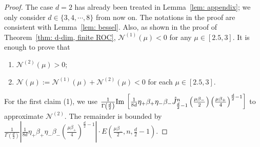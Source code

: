 \documentclass[11pt,a4paper,english,reqno]{amsart}
\theoremstyle{plain}
\newcommand{\1}{\mathbbm{1}}
\begin{document}
\begin{proof}
The case $d = 2$ has already been treated in Lemma~\ref{lem: appendix}; we only consider $d \in \{3, 4, \cdots, 8\}$ from now on.  The notations in the proof are consistent with Lemma~\ref{lem: bessel}. Also, as shown in the proof of Theorem~\ref{thm: d-dim, finite ROC}, $\mathcal{N}^{(1)}(\mu) < 0$ for any $\mu \in [2.5, 3]$. It is  enough to prove that
\begin{enumerate}
\item
$\mathcal{N}^{(2)}(\mu) >0$;
\item
$\mathcal{N}(\mu):=\mathcal{N}^{(1)}(\mu) + \mathcal{N}^{(2)}(\mu) < 0$ for each $\mu \in [2.5, 3]$.
\end{enumerate}

For the first claim (1), we use $\frac{1}{\Gamma\left(\frac{d}{2}\right)}{\rm Im}\,\left[\frac{1}{8d} \eta_{+}\beta_{+}\eta_-\beta_-\mathring{J}^{n}_{\frac{d}{2}-1}\left(\frac{\mu\beta_-}{2}\right)\left(\frac{\mu\beta_+}{4}\right)^{\frac{d}{2}-1} \right]$ to approximate $\mathcal{N}^{(2)}$. The remainder is bounded by $\frac{1}{\Gamma(\frac{d}{2})}\left|\frac{1}{8d} \eta_{+}\beta_{+}\eta_-\beta_- \left(\frac{\mu\beta_+}{4}\right)^{\frac{d}{2}-1}\right|\cdot E\left(\frac{\mu\beta_-}{2}, n, \frac{d}{2}-1\right)$.


\end{proof}
\end{document}

